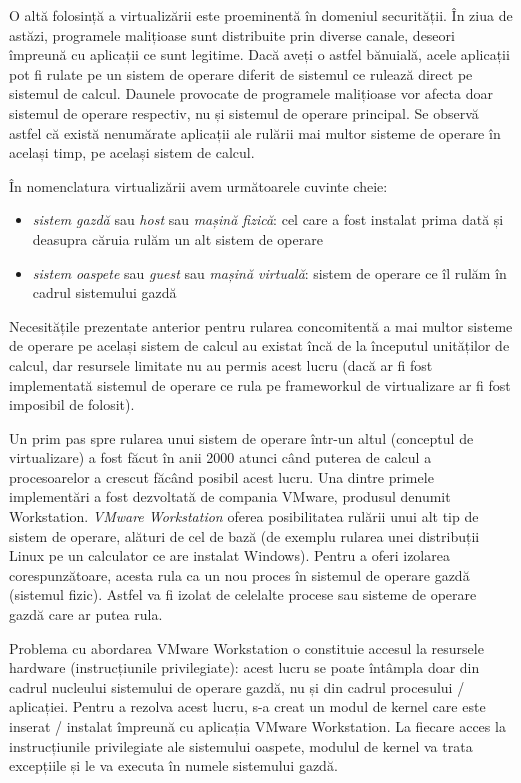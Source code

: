 O altă folosință a virtualizării este
proeminentă în domeniul securității. În ziua de astăzi, programele malițioase
sunt distribuite prin diverse canale, deseori împreună cu aplicații ce sunt
legitime. Dacă aveți o astfel bănuială, acele aplicații pot fi rulate pe un
sistem de operare diferit de sistemul ce rulează direct pe sistemul de calcul.
Daunele provocate de programele malițioase vor afecta doar sistemul de operare
respectiv, nu și sistemul de operare principal. Se observă astfel că există
nenumărate aplicații ale rulării mai multor sisteme de operare în același timp,
pe același sistem de calcul.

În nomenclatura virtualizării avem următoarele cuvinte cheie:

\begin{itemize}
	\item \textit{sistem gazdă} sau \textit{host} sau \textit{mașină
		fizică}: cel care a fost instalat prima dată și deasupra căruia
		rulăm un alt sistem de operare
	\item \textit{sistem oaspete} sau \textit{guest} sau \textit{mașină
		virtuală}: sistem de operare ce îl rulăm în cadrul sistemului
		gazdă
\end{itemize}

Necesitățile prezentate anterior pentru rularea concomitentă a mai multor
sisteme de operare pe același sistem de calcul au existat încă de la începutul
unităților de calcul, dar resursele limitate nu au permis acest lucru (dacă ar
fi fost implementată sistemul de operare ce rula pe frameworkul de virtualizare
ar fi fost imposibil de folosit).

Un prim pas spre rularea unui sistem de operare
într-un altul (conceptul de virtualizare) a fost făcut în anii 2000 atunci când
puterea de calcul a procesoarelor a crescut făcând posibil acest lucru. Una
dintre primele implementări a fost dezvoltată de compania VMware, produsul
denumit Workstation. \textit{VMware Workstation} oferea posibilitatea rulării
unui alt tip de sistem de operare, alături de cel de bază (de exemplu rularea
unei distribuții Linux pe un calculator ce are instalat Windows). Pentru a oferi
izolarea corespunzătoare, acesta rula ca un nou proces în sistemul de operare
gazdă (sistemul fizic). Astfel va fi izolat de celelalte procese sau sisteme de
operare gazdă care ar putea rula.

Problema cu abordarea VMware Workstation o constituie
accesul la resursele hardware (instrucțiunile privilegiate): acest lucru se
poate întâmpla doar din cadrul nucleului sistemului de operare gazdă, nu și din
cadrul procesului / aplicației. Pentru a rezolva acest lucru, s-a creat un modul de
kernel care este inserat / instalat împreună cu aplicația VMware Workstation. La
fiecare acces la instrucțiunile privilegiate ale sistemului oaspete, modulul de
kernel va trata excepțiile și le va executa în numele sistemului gazdă.

